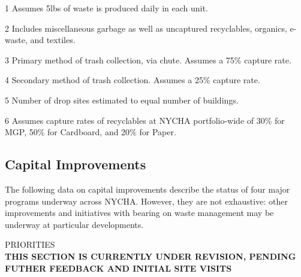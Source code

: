 \begin{table}[H]
\begin{threeparttable}
\small



\begin{tablenotes}
\item [1] Assumes 5lbs of waste is produced daily in each unit.
\item [2] Includes miscellaneous garbage as well as uncaptured recyclables, organics, e-waste, and textiles.
\item [3] Primary method of trash collection, via chute. Assumes a 75\% capture rate.
\item [4] Secondary method of trash collection. Assumes a 25\% capture rate.
\item [5] Number of drop sites estimated to equal number of buildings.
\item [6] Assumes capture rates of recyclables at NYCHA portfolio-wide of 30\% for MGP, 50\% for Cardboard, and 20\% for Paper. 
\end{tablenotes}
\end{threeparttable}
\end{table}

\pagebreak

\textcolor{ccorange}{\section{Capital Improvements}}

The following data on capital improvements describe the status of four major programs underway across NYCHA. However, they are not exhaustive: other improvements and initiatives with bearing on waste management may be underway at particular developments.
\begin{table}[H]



\end{table}
\pagebreak

\textcolor{ccorange}{PRIORITIES}
\\\textbf{THIS SECTION IS CURRENTLY UNDER REVISION, PENDING FUTHER FEEDBACK AND INITIAL SITE VISITS}


